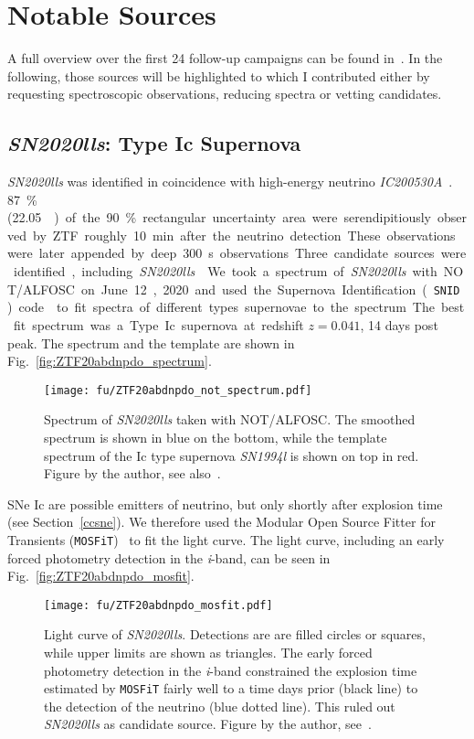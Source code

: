 \section{Notable Sources}
A full overview over the first 24 follow-up campaigns can be found in~. In the following, those sources will be highlighted to which I contributed either by requesting spectroscopic observations, reducing spectra or vetting candidates.

\subsection{\emph{SN2020lls}: Type Ic Supernova}\label{SN2020lls}
\textit{SN2020lls} was identified in coincidence with high-energy neutrino \emph{IC200530A}~. \SI{87}{\percent} (\SI{22.05}{\square\deg}) of the \SI{90}{\percent} rectangular uncertainty area were serendipitiously observed by ZTF roughly \SI{10}{\minute} after the neutrino detection. These observations were later appended by deep \SI{300}{\second} observations Three candidate sources were identified, including \emph{SN2020lls}~.

We took a spectrum of \emph{SN2020lls} with NOT/ALFOSC on June 12, 2020 and used the Supernova Identification (\texttt{SNID}) code~ to fit spectra of different types supernovae to the spectrum. The best fit spectrum was a Type Ic supernova at redshift $z=0.041$, 14 days post peak. The spectrum and the template are shown in Fig.~\ref{fig:ZTF20abdnpdo_spectrum}.

\begin{figure}[h!]
    \texttt{[image: fu/ZTF20abdnpdo\_not\_spectrum.pdf]}
    \caption[SN2020lls spectrum]{Spectrum of \textit{SN2020lls} taken with NOT/ALFOSC. The smoothed spectrum is shown in blue on the bottom, while the template spectrum of the Ic type supernova \emph{SN1994l} is shown on top in red. Figure by the author, see also~\cite{Stein2023a}.}
\end{figure}
SNe Ic are possible emitters of neutrino, but only shortly after explosion time (see Section~\ref{ccsne}). We therefore used the Modular Open Source Fitter for Transients (\texttt{MOSFiT})~ to fit the light curve. The light curve, including an early forced photometry detection in the \textit{i}-band, can be seen in Fig.~\ref{fig:ZTF20abdnpdo_mosfit}.

\begin{figure}[htb]
    \texttt{[image: fu/ZTF20abdnpdo\_mosfit.pdf]}
    \caption[\emph{SN2020lls} light curve fit]{Light curve of \emph{SN2020lls}. Detections are are filled circles or squares, while upper limits are shown as triangles. The early forced photometry detection in the \textit{i}-band constrained the explosion time estimated by \texttt{MOSFiT} fairly well to a time days prior (black line) to the detection of the neutrino (blue dotted line). This ruled out \emph{SN2020lls} as candidate source. Figure by the author, see~\cite{Stein2023a}.}
\end{figure}

